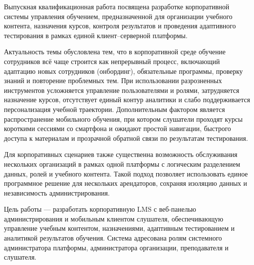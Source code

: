 \Introduction

Выпускная квалификационная работа посвящена разработке корпоративной системы управления обучением, предназначенной для организации учебного контента, назначения курсов, контроля результатов и проведения адаптивного тестирования в рамках единой клиент--серверной платформы\cite{metodichka_vkr_ikt_2021}.

Актуальность темы обусловлена тем, что в корпоративной среде обучение сотрудников всё чаще строится как непрерывный процесс, включающий адаптацию новых сотрудников (онбординг), обязательные программы, проверку знаний и повторение проблемных тем. При использовании разрозненных инструментов усложняется управление пользователями и ролями, затрудняется назначение курсов, отсутствует единый контур аналитики и слабо поддерживается персонализация учебной траектории. Дополнительным фактором является распространение мобильного обучения, при котором слушатели проходят курсы короткими сессиями со смартфона и ожидают простой навигации, быстрого доступа к материалам и прозрачной обратной связи по результатам тестирования\cite{mobile_learning_solutions_2024,opigno_mobile_lms_2024}.

Для корпоративных сценариев также существенна возможность обслуживания нескольких организаций в рамках одной платформы с логическим разделением данных, ролей и учебного контента. Такой подход позволяет использовать единое программное решение для нескольких арендаторов, сохраняя изоляцию данных и независимость администрирования\cite{moodle_multitenancy_2024,yojji_multitenant_lms_2025}.

Цель работы --- разработать корпоративную LMS с веб-панелью администрирования и мобильным клиентом слушателя, обеспечивающую управление учебным контентом, назначениями, адаптивным тестированием и аналитикой результатов обучения. Система адресована ролям системного администратора платформы, администратора организации, преподавателя и слушателя.

